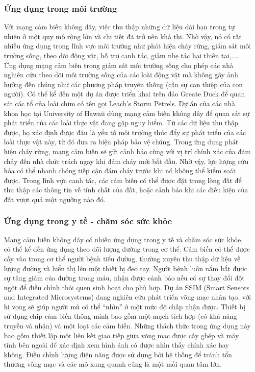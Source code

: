 \documentclass{article}
\begin{document}
\subsubsection{Ứng dụng trong môi trường}
Với mạng cảm biến không dây, việc thu thập những dữ liệu dài hạn trong tự nhiên ở một quy mô rộng lớn và chi tiết đã trở nên khả thi. Nhờ vậy, nó có rất nhiều ứng dụng trong lĩnh vực môi trường như phát hiện cháy rừng, giám sát môi trường sống, theo dõi động vật, hỗ trợ canh tác, giảm nhẹ tác hại thiên tai,....
\newline Ứng dụng mạng cảm biến trong giám sát môi trường sống cho phép các nhà nghiên cứu theo dõi môi trường sống của các loài động vật mà không gây ảnh hưởng đến chúng như các phương pháp truyền thống (cần sự can thiệp của con người). Có thể kể đến một dự án được triển khai trên đảo Greate Duck để quan sát các tổ của loài chim có tên gọi Leach’s Storm Petrels. Dự án của các nhà khoa học tại University of Hawaii dùng mạng cảm biến không dây để quan sát sự phát triển của các loài thực vật đang gặp nguy hiểm. Từ các dữ liệu thu thập được, họ xác định được đâu là yểu tố môi trường thúc đẩy sự phát triển của các loài thực vật này, từ đó đưa ra biện pháp bảo vệ chúng.
\newline Trong ứng dụng phát hiện cháy rừng, mạng cảm biến sẽ gửi cảnh báo cùng với vị trí chính xác của đám cháy đến nhà chức trách ngay khi đám cháy mới bắt đầu. Nhờ vậy, lực lượng cứu hỏa có thể nhanh chóng tiếp cận đám cháy trước khi nó không thể kiểm soát được. 
\newline Trong lĩnh vực canh tác, các cảm biến có thể được đặt trong lòng đất để thu thập các thông tin về tính chất của đất, hoặc cảnh báo khi các điều kiện của đất vượt quá một ngưỡng nào đó.
\subsubsection{Ứng dụng trong y tế - chăm sóc sức khỏe}
Mạng cảm biến không dây có nhiều ứng dụng trong y tế và chăm sóc sức khỏe, có thể kể đến ứng dụng theo dõi lượng đường trong cơ thể. Cảm biến có thể được cấy vào trong cơ thể người bệnh tiểu đường, thường xuyên thu thập dữ liệu về lượng đường và hiển thị lên một thiết bị đeo tay. Người bệnh luôn nắm bắt được sự tăng giảm của đường trong máu, nhận được cảnh báo nếu có sự thay đổi đột ngột để điều chỉnh thói quen sinh hoạt cho phù hợp. 
\newline Dự án SSIM (Smart Sensors and Integrated Microsystems) đang nghiên cứu phát triển võng mạc nhân tạo, với hi vọng sẽ giúp người mù có thể “nhìn” ở một mức độ chấp nhận được. Thiết bị sử dụng chip cảm biến thông minh bao gồm một mạch tích hợp (có khả năng truyền và nhận) và một loạt các cảm biến. Những thách thức trong ứng dụng này bao gồm thiết lập một liên kết giao tiếp giữa võng mạc được cấy ghép và máy tính bên ngoài để xác định xem hình ảnh có được nhìn thấy chính xác hay không. Điều chỉnh lượng điện năng được sử dụng bởi hệ thống để tránh tổn thương võng mạc và các mô xung quanh cũng là một mối quan tâm lớn.
\end{document}
